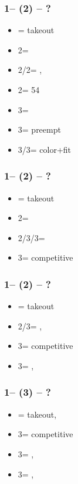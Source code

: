 \documentclass[12pt, a4paper]{report}
\begin{document}
{{{            \subsubsection*{1\diams -- (2\clubs) -- ?}
            \begin{itemize}
                \item \dbl = takeout
                \item 2\diams = \nat
                \item 2\hearts/2\spades = \nat, \fonce
                \item 2\nt = 54\major
                \item 3\clubs = \diams\ \invp
                \item 3\diams = preempt
                \item 3\hearts/3\spades = color+fit
            \end{itemize}

            \subsubsection*{1\diams -- (2\hearts) -- ?}
            \begin{itemize}
                \item \dbl = takeout
                \item 2\spades = \nat\ \nf
                \item 2\nt/3\clubs/3\hearts = \trsf{\clubs/\diams/\spades} \invp
                \item 3\diams = competitive
            \end{itemize}

            \subsubsection*{1\diams -- (2\spades) -- ?}
            \begin{itemize}
                \item \dbl = takeout
                \item 2\nt/3\clubs = \trsf{\clubs/\diams}, \invp
                \item 3\diams = competitive
                \item 3\hearts = \nat, \gf
            \end{itemize}

            \subsubsection*{1\diams -- (3\clubs) -- ?}
            \begin{itemize}
                \item \dbl = takeout, \gf
                \item 3\diams = competitive
                \item 3\hearts = \spades, \invp
                \item 3\spades = \hearts, \gf
            \end{itemize}

}}}
\end{document}
